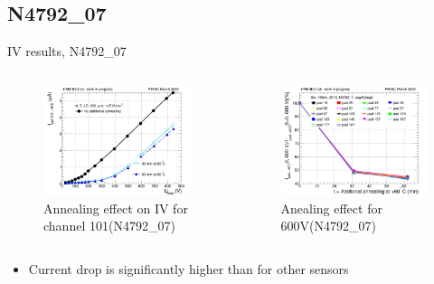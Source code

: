 \documentclass{beamer}
\begin{document}
\subsection{N4792\_07}


\begin{frame}{IV results, N4792\_07}
  \begin{columns}
       \begin{figure}
           \includegraphics[width=1.0\textwidth]{plots/annealing_IV_ch101_N4792_7.png}
           \caption{Annealing effect on IV for channel 101(N4792\_07)}
       \end{figure}
       \begin{figure}
           \includegraphics[width=1.0\textwidth]{plots/annealing_current_N4792_7.png}
           \caption{Anealing effect for 600V(N4792\_07)}
       \end{figure}
   \end{columns}
   \begin{itemize}
    \item Current drop is significantly higher than for other sensors
   \end{itemize}
\end{frame}
\end{document}

